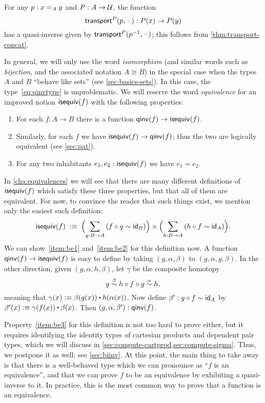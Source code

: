\begin{eg}\label{thm:transportequiv}
  For any $p:\id[A]xy$ and $P:A\to\type$, the function
  \[\transfib{P}{p}{\blank}:P(x) \to P(y)\]
  has a quasi-inverse given by $\transfib{P}{\opp p}{\blank}$; this follows from \narrowbreak \cref{thm:transport-concat}.
\end{eg}

In general, we will only use the word \emph{isomorphism}
(and similar words such as \emph{bijection}, and the associated notation $A\cong B$)
in the special case when the types $A$ and $B$ ``behave like sets'' (see \cref{sec:basics-sets}).
In this case, the type~\eqref{eq:qinvtype} is unproblematic.
We will reserve the word \emph{equivalence} for an improved notion $\isequiv (f)$ with the following properties:%
\begin{enumerate}
\item For each $f:A\to B$ there is a function $\qinv(f) \to \isequiv (f)$.\label{item:be1}
\item Similarly, for each $f$ we have $\isequiv (f) \to \qinv(f)$; thus the two are logically equivalent (see \cref{sec:pat}).\label{item:be2}
\item For any two inhabitants $e_1,e_2:\isequiv(f)$ we have $e_1=e_2$.\label{item:be3}
\end{enumerate}
In \cref{cha:equivalences} we will see that there are many different definitions of $\isequiv(f)$ which satisfy these three properties, but that all of them are equivalent.
For now, to convince the reader that such things exist, we mention only the easiest such definition:
\begin{equation}\label{eq:isequiv-invertible}
  \isequiv(f) \;\defeq\;
  \Parens{\sm{g:B\to A} (f\circ g \htpy \idfunc[B])}
  \times
  \Parens{\sm{h:B\to A} (h\circ f \htpy \idfunc[A])}.
\end{equation}
We can show~\ref{item:be1} and~\ref{item:be2} for this definition now.
A function $\qinv(f) \to \isequiv (f)$ is easy to define by taking $(g,\alpha,\beta)$ to $(g,\alpha,g,\beta)$.
In the other direction, given $(g,\alpha,h,\beta)$, let $\gamma$ be the composite homotopy
\[ g \overset{\beta}{\htpy} h\circ f\circ g \overset{\alpha}{\htpy} h, \]
meaning that $\gamma(x) \defeq \beta(g(x)) \ct \ap{h}{\alpha(x)}$.
Now define $\beta':g\circ f\htpy \idfunc[A]$ by $\beta'(x) \defeq \gamma(f(x)) \ct \beta(x)$.
Then $(g,\alpha,\beta'):\qinv(f)$.

Property~\ref{item:be3} for this definition is not too hard to prove either, but it requires identifying the identity types of cartesian products and dependent pair types, which we will discuss in \cref{sec:compute-cartprod,sec:compute-sigma}.
Thus, we postpone it as well; see \cref{sec:biinv}.
At this point, the main thing to take away is that there is a well-behaved type which we can pronounce as ``$f$ is an equivalence'', and that we can prove $f$ to be an equivalence by exhibiting a quasi-inverse to it.
In practice, this is the most common way to prove that a function is an equivalence.

